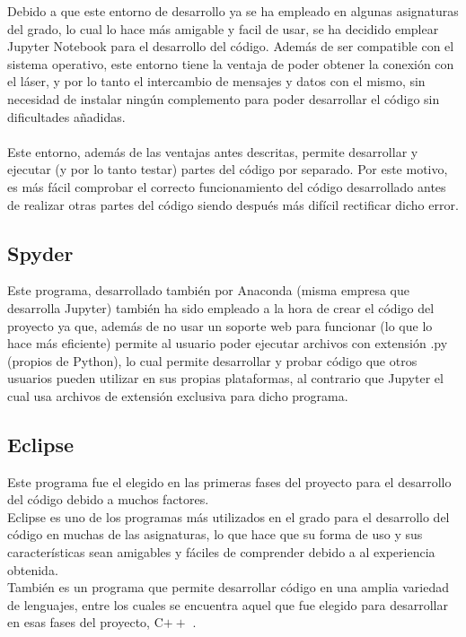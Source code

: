 Debido a que este entorno de desarrollo ya se ha empleado en algunas asignaturas del grado, lo cual lo hace más amigable y facil de usar, se ha decidido emplear Jupyter Notebook para el desarrollo del código. Además de ser compatible con el sistema operativo, este entorno tiene la ventaja de poder obtener la conexión con el láser, y por lo tanto el intercambio de mensajes y datos con el mismo, sin necesidad de instalar ningún complemento para poder desarrollar el código sin dificultades añadidas.\\
\\
Este entorno, además de las ventajas antes descritas, permite desarrollar y ejecutar (y por lo tanto testar) partes del código por separado. Por este motivo, es más fácil comprobar el correcto funcionamiento del código desarrollado antes de realizar otras partes del código siendo después más difícil rectificar dicho error.

\subsection{Spyder}

Este programa, desarrollado también por Anaconda (misma empresa que desarrolla Jupyter) también ha sido empleado a la hora de crear el código del proyecto ya que, además de no usar un soporte web para funcionar (lo que lo hace más eficiente) permite al usuario poder ejecutar archivos con extensión .py (propios de Python), lo cual permite desarrollar y probar código que otros usuarios pueden utilizar en sus propias plataformas, al contrario que Jupyter el cual usa archivos de extensión exclusiva para dicho programa.

\subsection{Eclipse}

Este programa fue el elegido en las primeras fases del proyecto para el desarrollo del código debido a muchos factores.\\
Eclipse es uno de los programas más utilizados en el grado para el desarrollo del código en muchas de las asignaturas, lo que hace que su forma de uso y sus características sean amigables y fáciles de comprender debido a al experiencia obtenida.\\
También es un programa que permite desarrollar código en una amplia variedad de lenguajes, entre los cuales se encuentra aquel que fue elegido para desarrollar en esas fases del proyecto, C$++$ . 

